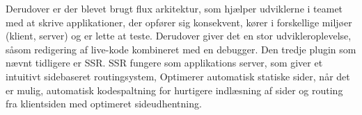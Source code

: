 Derudover er der blevet brugt flux arkitektur, som hjælper udviklerne i teamet med at skrive applikationer, der opfører sig konsekvent, kører i forskellige miljøer (klient, server) og er lette at teste. Derudover giver det en stor udvikleroplevelse, såsom redigering af live-kode kombineret med en debugger. 
Den tredje plugin som nævnt tidligere er SSR. SSR fungere som applikations server, som giver et intuitivt sidebaseret routingsystem, Optimerer automatisk statiske sider, når det er mulig, automatisk kodespaltning for hurtigere indlæsning af sider og routing fra klientsiden med optimeret sideudhentning. 


 



